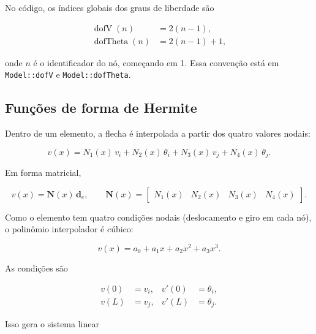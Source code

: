 \documentclass[12pt,a4paper]{article}
\begin{document}
No código, os índices globais dos graus de liberdade são

\begin{align}
  \operatorname{dofV}(n) &= 2(n-1), \label{eq:dofV}\\
  \operatorname{dofTheta}(n) &= 2(n-1)+1, \label{eq:dofTheta}
\end{align}

onde \(n\) é o identificador do nó, começando em 1. Essa convenção está em \texttt{Model::dofV} e \texttt{Model::dofTheta}.

\subsection{Funções de forma de Hermite}
\label{sec:hermite}

Dentro de um elemento, a flecha é interpolada a partir dos quatro valores nodais:

\begin{equation}
  v(x) = N_1(x)\,v_i + N_2(x)\,\theta_i + N_3(x)\,v_j + N_4(x)\,\theta_j.
  \label{eq:interp}
\end{equation}

Em forma matricial,

\begin{equation}
  v(x) = \mathbf{N}(x)\,\mathbf{d}_e,
  \qquad
  \mathbf{N}(x) =
  \begin{bmatrix} N_1(x) & N_2(x) & N_3(x) & N_4(x) \end{bmatrix}.
  \label{eq:Nmat}
\end{equation}

Como o elemento tem quatro condições nodais (deslocamento e giro em cada nó), o polinômio interpolador é cúbico:

\begin{equation}
  v(x) = a_0 + a_1 x + a_2 x^2 + a_3 x^3.
  \label{eq:cubica}
\end{equation}

As condições são

\begin{align}
  v(0) &= v_i, & v'(0) &= \theta_i, \label{eq:cond1}\\
  v(L) &= v_j, & v'(L) &= \theta_j. \label{eq:cond2}
\end{align}

Isso gera o sistema linear
\end{document}
